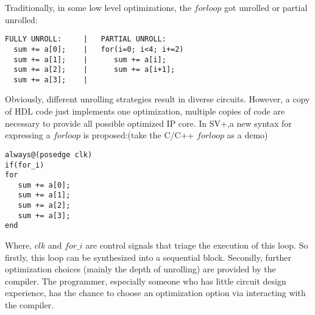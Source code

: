 Traditionally, in some low level optimizations, the $forloop$ got unrolled or partial unrolled:
\begin{verbatim}
FULLY UNROLL:     |   PARTIAL UNROLL:
  sum += a[0];    |   for(i=0; i<4; i+=2)
  sum += a[1];    |      sum += a[i];
  sum += a[2];    |      sum += a[i+1];
  sum += a[3];    |
\end{verbatim}

Obviously, different unrolling strategies result in diverse circuits.
However, a copy of HDL code just implements one optimization, multiple copies of code are necessary to provide all possible optimized IP core. In SV+,a new syntax for expressing a $forloop$ is proposed:(take the C/C++ $forloop$ as a demo)
\begin{verbatim}
always@(posedge clk)
if(for_i)
for
   sum += a[0];
   sum += a[1];
   sum += a[2];
   sum += a[3];
end
\end{verbatim}
Where, $clk$ and $for\_i$ are control signals that triage the execution of this loop. So firstly, this loop can be synthesized into a sequential block. Secondly, further optimization choices (mainly the depth of unrolling) are provided by the compiler. The programmer, especially someone who has little circuit design experience, has the chance to choose an optimization option via interacting with the compiler.     
